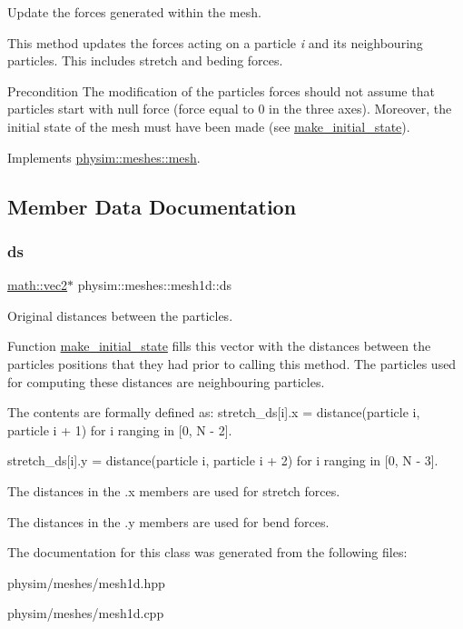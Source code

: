 Update the forces generated within the mesh. 

This method updates the forces acting on a particle {\itshape i} and its neighbouring particles. This includes stretch and beding forces.

\begin{DoxyPrecond}{Precondition}
The modification of the particle\textquotesingle{}s forces should not assume that particles start with null force (force equal to 0 in the three axes). Moreover, the initial state of the mesh must have been made (see \hyperlink{classphysim_1_1meshes_1_1mesh1d_a6f2275fbab0ddfcbf523cc5a359e1d9c}{make\+\_\+initial\+\_\+state}). 
\end{DoxyPrecond}


Implements \hyperlink{classphysim_1_1meshes_1_1mesh_ad7cad4cd454cce562c8c404ef09f8bd3}{physim\+::meshes\+::mesh}.



\subsection{Member Data Documentation}
\mbox{\label{classphysim_1_1meshes_1_1mesh1d_a9f185406b79496adfb33947591620ddf}} 
\subsubsection{\texorpdfstring{ds}{ds}}
{\footnotesize\ttfamily \hyperlink{structphysim_1_1math_1_1vec2}{math\+::vec2}$\ast$ physim\+::meshes\+::mesh1d\+::ds\hspace{0.3cm}{\ttfamily [private]}}



Original distances between the particles. 

Function \hyperlink{classphysim_1_1meshes_1_1mesh1d_a6f2275fbab0ddfcbf523cc5a359e1d9c}{make\+\_\+initial\+\_\+state} fills this vector with the distances between the particles\textquotesingle{} positions that they had prior to calling this method. The particles used for computing these distances are neighbouring particles.

The contents are formally defined as\+: stretch\+\_\+ds\mbox{[}i\mbox{]}.x = distance(particle i, particle i + 1) for i ranging in \mbox{[}0, N -\/ 2\mbox{]}.

stretch\+\_\+ds\mbox{[}i\mbox{]}.y = distance(particle i, particle i + 2) for i ranging in \mbox{[}0, N -\/ 3\mbox{]}.

The distances in the .x members are used for stretch forces.

The distances in the .y members are used for bend forces. 

The documentation for this class was generated from the following files\+:\begin{DoxyCompactItemize}
\item 
physim/meshes/mesh1d.\+hpp\item 
physim/meshes/mesh1d.\+cpp\end{DoxyCompactItemize}

